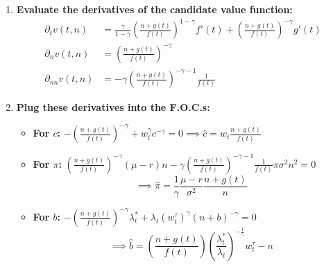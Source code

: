 \begin{enumerate}
    \item \textbf{Evaluate the derivatives of the candidate value function:}
    \begin{align*}
        \partial_t v(t, n) &= \frac{\gamma}{1-\gamma} \left( \frac{n + g(t)}{f(t)} \right)^{1-\gamma} f'(t) + \left( \frac{n + g(t)}{f(t)} \right)^{-\gamma} g'(t) \\
        \partial_n v(t, n) &= \left( \frac{n + g(t)}{f(t)} \right)^{-\gamma} \\
        \partial_{nn} v(t, n) &= -\gamma \left( \frac{n + g(t)}{f(t)} \right)^{-\gamma-1} \frac{1}{f(t)}
    \end{align*}

    \item \textbf{Plug these derivatives into the F.O.C.s:}
    \begin{itemize}
        \item[(a)] \textbf{For $c$:} $-\left( \frac{n + g(t)}{f(t)} \right)^{-\gamma} + w_t^\gamma c^{-\gamma} = 0 \implies \hat{c} = w_t \frac{n + g(t)}{f(t)}$
        \item[(b)] \textbf{For $\pi$:} $\left( \frac{n + g(t)}{f(t)} \right)^{-\gamma} (\mu - r)n - \gamma \left( \frac{n + g(t)}{f(t)} \right)^{-\gamma-1} \frac{1}{f(t)} \pi \sigma^2 n^2 = 0$
        \begin{equation*}
            \implies \hat{\pi} = \frac{1}{\gamma} \frac{\mu - r}{\sigma^2} \frac{n + g(t)}{n}
        \end{equation*}
        \item[(c)] \textbf{For $b$:} $-\left( \frac{n + g(t)}{f(t)} \right)^{-\gamma} \lambda_t^* + \lambda_t (w_t^\tau)^\gamma (n + b)^{-\gamma} = 0$
        \begin{equation*}
            \implies \hat{b} = \left( \frac{n + g(t)}{f(t)} \right) \left( \frac{\lambda_t^*}{\lambda_t} \right)^{-\frac{1}{\gamma}} w_t^\tau - n
        \end{equation*}
    \end{itemize}
\end{enumerate}

